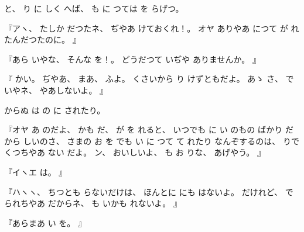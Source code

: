 %
と、
%
り
に
しく
へば、
%
も
に
つては
を
らげつ。

%
『アヽ、
%
たしか
だつたネ、
%
ぢやあ
けておくれ！。
%
オヤ
ありやあ
につて
が
れたんだつたのに。
』

%
『あら
いやな、
%
そんな
を！。
%
どうだつて
いぢや
ありませんか。
』

%
『
かい。
%
ぢやあ、
%
まあ、
%
ふよ。
%
くさいから
り
けずともだよ。
%
あゝ
さ、
%
で
いやネ、
%
やあしないよ。
』

%
からぬ
は
の
に
されたり。

%
『オヤ
あ
のだよ、
かも
だ、
%
が
を
れると、
%
いつでも
に
い
のもの
ばかり
だから
しいのさ、
%
さまの
お
を
でも
い
に
つて
て
れたり
なんぞするのは、
%
りで
くつちやあ
ない
だよ。
%
ン、
%
おいしいよ、
%
も
お
りな、
%
あげやう。
』

%
『イヽエ
は。
』

%
『ハヽヽ、
%
ちつとも
らないだけは、
%
ほんとに
にも
はないよ。
%
だけれど、
%
で
られちやあ
だからネ、
%
も
いかも
れないよ。
』

%
『あらまあ
い
を。
』

